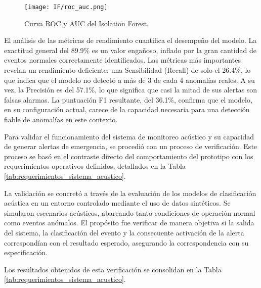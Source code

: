 \begin{figure}[ht!]
      \centering
      \texttt{[image: IF/roc\_auc.png]}
      \caption{Curva ROC y AUC del Isolation Forest.}
      \label{fig:roc_if}
\end{figure}

El análisis de las métricas de rendimiento cuantifica el desempeño del modelo. La exactitud general del 89.9\% es un valor engañoso, inflado por la gran cantidad de eventos normales correctamente identificados. Las métricas más importantes revelan un rendimiento deficiente: una Sensibilidad (Recall) de solo el 26.4\%, lo que indica que el modelo no detectó a más de 3 de cada 4 anomalías reales. A su vez, la Precisión es del 57.1\%, lo que significa que casi la mitad de sus alertas son falsas alarmas. La puntuación F1 resultante, del 36.1\%, confirma que el modelo, en su configuración actual, carece de la capacidad necesaria para una detección fiable de anomalías en este contexto.


Para validar el funcionamiento del sistema de monitoreo acústico y su capacidad de generar alertas de emergencia, se procedió con un proceso de verificación. Este proceso se basó en el contraste directo del comportamiento del prototipo con los requerimientos operativos definidos, detallados en la Tabla \ref{tab:requerimientos_sistema_acustico}.

La validación se concretó a través de la evaluación de los modelos de clasificación acústica en un entorno controlado mediante el uso de datos sintéticos. Se simularon escenarios acústicos, abarcando tanto condiciones de operación normal como eventos anómalos. El propósito fue verificar de manera objetiva si la salida del sistema, la clasificación del evento y la consecuente activación de la alerta correspondían con el resultado esperado, asegurando la correspondencia con su especificación.

Los resultados obtenidos de esta verificación se consolidan en la Tabla \ref{tab:requerimientos_sistema_acustico}.
